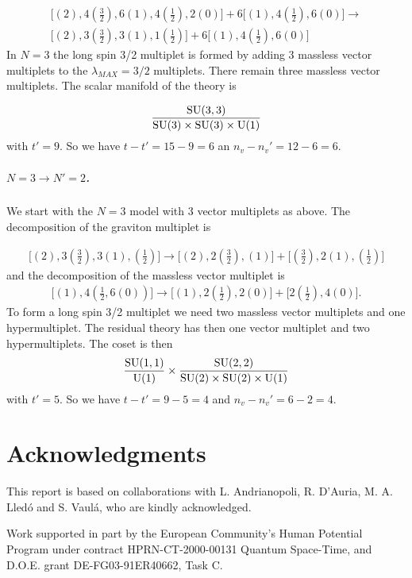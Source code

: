 \documentclass[a4paper,12pt]{article}
\begin{document}
\begin{eqnarray*}\bigl[(2), 4(\frac{3}{2}), 6(1), 4(\frac{1}{2}),2(0)\bigr]+
6\bigl[(1), 4(\frac{1}{2}), 6(0)\bigr]\rightarrow\\ \bigl[(2),
3(\frac{3}{2}), 3(1), 1(\frac{1}{2})\bigr]+6\bigl[(1),
4(\frac{1}{2}),6(0)\bigr]\end{eqnarray*} In $N=3$ the long spin
3/2 multiplet is formed by adding 3 massless vector  multiplets to
the $\lambda_{MAX}=3/2$ multiplets. There remain three massless
vector multiplets. The scalar manifold of the theory is

$$\frac{\mathrm{SU}(3,3)}{\mathrm{SU}(3)\times\mathrm{SU}(3)\times\mathrm{U}(1)} $$
with $t'=9$. So we have $t-t'=15-9=6$ an $n_v-n_v'=12-6=6$.


\subparagraph{$N=3\rightarrow N'=2$.} We start with the $N=3$
model with 3 vector multiplets as above. The decomposition of the
graviton multiplet is

\begin{eqnarray*}\bigl[(2), 3(\frac{3}{2}), 3(1), (\frac{1}{2})\bigr]\rightarrow
\bigl[(2), 2(\frac{3}{2}), (1)\bigr]+\bigl[(\frac{3}{2}), 2(1),
(\frac{1}{2})\bigr]\end{eqnarray*} and the decomposition of the
massless vector multiplet is
\begin{eqnarray*}\bigl[(1), 4(\frac{1}{2}, 6(0))\bigr]\rightarrow
\bigl[(1), 2(\frac{1}{2}), 2(0)\bigr]+\bigl[2(\frac{1}{2}),
4(0)\bigr].\end{eqnarray*} To form a long spin 3/2 multiplet we
need two massless vector multiplets and one hypermultiplet.  The
residual theory has then one vector multiplet and two
hypermultiplets. The coset is then
$$\frac{\mathrm{SU}(1,1)}{\mathrm{U}(1)}\times\frac{\mathrm{SU}(2,2)}{\mathrm{SU}(2)\times\mathrm{SU}(2)\times
\mathrm{U}(1) } $$ with $t'=5$. So we have $t-t'=9-5=4$ and
$n_v-n_v'=6-2=4$.

\section*{Acknowledgments}
This report is based on  collaborations with L. Andrianopoli, R. D'Auria, M. A. Lled\'o and S. Vaul\'a, who 
are kindly acknowledged.


 Work supported in part by the European Community's Human
Potential Program under contract HPRN-CT-2000-00131 Quantum
Space-Time, and D.O.E. grant DE-FG03-91ER40662, Task C.
\end{document}
